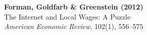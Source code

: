\documentclass[12pt]{article}
\begin{document}
\begin{center}
{\Large\bfseries Forman, Goldfarb \& Greenstein (2012)}\\
{\large The Internet and Local Wages: A Puzzle}\\
\vspace{0.5em}
{\normalsize \textit{American Economic Review}, 102(1), 556--575}
\end{center}

\vspace{1em}




\end{document}
